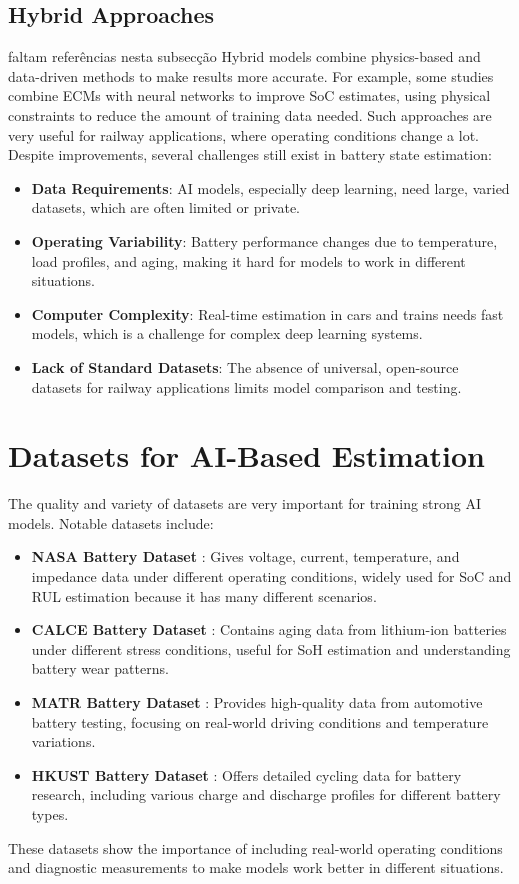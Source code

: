 \subsection{Hybrid Approaches}
\color{Red}faltam referências nesta subsecção\color{Black}
Hybrid models combine physics-based and data-driven methods to make results more accurate. For example, some studies combine ECMs with neural networks to improve SoC estimates, using physical constraints to reduce the amount of training data needed. Such approaches are very useful for railway applications, where operating conditions change a lot. Despite improvements, several challenges still exist in battery state estimation:
\begin{itemize}
    \item \textbf{Data Requirements}: AI models, especially deep learning, need large, varied datasets, which are often limited or private.
    \item \textbf{Operating Variability}: Battery performance changes due to temperature, load profiles, and aging, making it hard for models to work in different situations.
    \item \textbf{Computer Complexity}: Real-time estimation in cars and trains needs fast models, which is a challenge for complex deep learning systems.
    \item \textbf{Lack of Standard Datasets}: The absence of universal, open-source datasets for railway applications limits model comparison and testing.
\end{itemize}


\section{Datasets for AI-Based Estimation}
\label{subsec:datasets}
The quality and variety of datasets are very important for training strong AI models. Notable datasets include:
\begin{itemize}
    \item \textbf{NASA Battery Dataset} \cite{noauthor_nasa_nodate}: Gives voltage, current, temperature, and impedance data under different operating conditions, widely used for SoC and RUL estimation because it has many different scenarios.
    \item \textbf{CALCE Battery Dataset} \cite{CALCE_battery_nodate}: Contains aging data from lithium-ion batteries under different stress conditions, useful for SoH estimation and understanding battery wear patterns.
    \item \textbf{MATR Battery Dataset} \cite{MATR_dataset_nodate}: Provides high-quality data from automotive battery testing, focusing on real-world driving conditions and temperature variations.
    \item \textbf{HKUST Battery Dataset} \cite{pepe_hkust_nodate}: Offers detailed cycling data for battery research, including various charge and discharge profiles for different battery types. 
\end{itemize}
These datasets show the importance of including real-world operating conditions and diagnostic measurements to make models work better in different situations.




